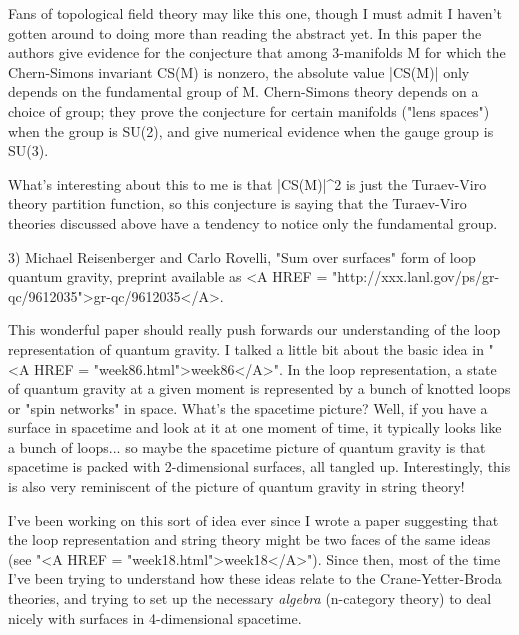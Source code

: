 Fans of topological field theory may like this one, though I must
admit I haven't gotten around to doing more than reading the abstract
yet.  In this paper the authors give evidence for the conjecture
that among 3-manifolds M for which the Chern-Simons invariant CS(M) is
nonzero, the absolute value |CS(M)| only depends on the fundamental
group of M.  Chern-Simons theory depends on a choice of group; they 
prove the conjecture for certain manifolds ("lens spaces") when
the group is SU(2), and give numerical evidence when the gauge group
is SU(3).  

What's interesting about this to me is that |CS(M)|^2 is just the
Turaev-Viro theory partition function, so this conjecture is saying
that the Turaev-Viro theories discussed above have a tendency to notice
only the fundamental group. 

3) Michael Reisenberger and Carlo Rovelli, "Sum over surfaces" form
of loop quantum gravity, preprint available as <A HREF = "http://xxx.lanl.gov/ps/gr-qc/9612035">gr-qc/9612035</A>.

This wonderful paper should really push forwards our understanding
of the loop representation of quantum gravity.  I talked a little
bit about the basic idea in "<A HREF = "week86.html">week86</A>".  In the loop representation,
a state of quantum gravity at a given moment is represented by a bunch
of knotted loops or "spin networks" in space.  What's the spacetime
picture?  Well, if you have a surface in spacetime and look at it
at one moment of time, it typically looks like a bunch of loops... so
maybe the spacetime picture of quantum gravity is that spacetime is
packed with 2-dimensional surfaces, all tangled up.  Interestingly,
this is also very reminiscent of the picture of quantum gravity in 
string theory! 

I've been working on this sort of idea ever since I wrote a paper
suggesting that the loop representation and string theory might be
two faces of the same ideas (see "<A HREF = "week18.html">week18</A>").  Since then, most of the 
time I've been trying to understand how these ideas relate to the 
Crane-Yetter-Broda theories, and trying to set up the necessary \emph{algebra} 
(n-category theory) to deal nicely with surfaces in 4-dimensional spacetime.

